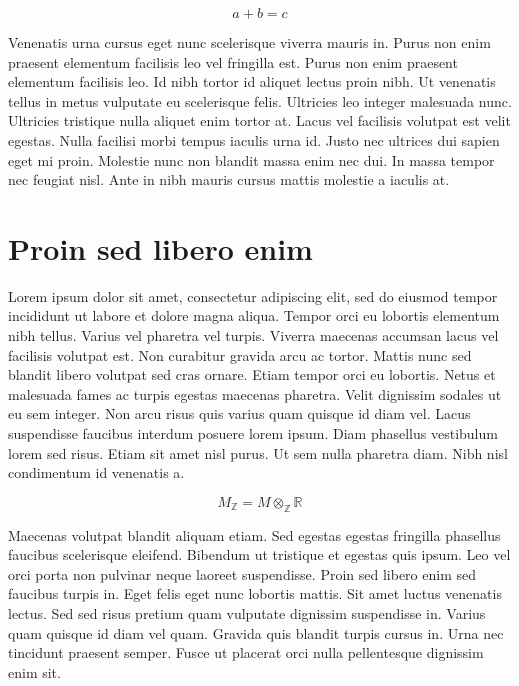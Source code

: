 \documentclass[12pt, a4paper]{article}
\numberwithin{equation}{section}
\begin{document}
\begin{equation}
  a + b = c
\end{equation}

Venenatis urna cursus eget nunc scelerisque viverra mauris in. Purus non enim praesent elementum facilisis leo vel fringilla est. Purus non enim praesent elementum facilisis leo. Id nibh tortor id aliquet lectus proin nibh. Ut venenatis tellus in metus vulputate eu scelerisque felis. Ultricies leo integer malesuada nunc. Ultricies tristique nulla aliquet enim tortor at. Lacus vel facilisis volutpat est velit egestas. Nulla facilisi morbi tempus iaculis urna id. Justo nec ultrices dui sapien eget mi proin. Molestie nunc non blandit massa enim nec dui. In massa tempor nec feugiat nisl. Ante in nibh mauris cursus mattis molestie a iaculis at.


\section{Proin sed libero enim}

Lorem ipsum dolor sit amet, consectetur adipiscing elit, sed do eiusmod tempor incididunt ut labore et dolore magna aliqua. Tempor orci eu lobortis elementum nibh tellus. Varius vel pharetra vel turpis. Viverra maecenas accumsan lacus vel facilisis volutpat est. Non curabitur gravida arcu ac tortor. Mattis nunc sed blandit libero volutpat sed cras ornare. Etiam tempor orci eu lobortis. Netus et malesuada fames ac turpis egestas maecenas pharetra. Velit dignissim sodales ut eu sem integer. Non arcu risus quis varius quam quisque id diam vel. Lacus suspendisse faucibus interdum posuere lorem ipsum. Diam phasellus vestibulum lorem sed risus. Etiam sit amet nisl purus. Ut sem nulla pharetra diam. Nibh nisl condimentum id venenatis a.

\begin{equation}
  M_{\mathbb{Z}} = M \otimes_{\mathbb{Z}} \mathbb{R}
\end{equation}

Maecenas volutpat blandit aliquam etiam. Sed egestas egestas fringilla phasellus faucibus scelerisque eleifend. Bibendum ut tristique et egestas quis ipsum. Leo vel orci porta non pulvinar neque laoreet suspendisse. Proin sed libero enim sed faucibus turpis in. Eget felis eget nunc lobortis mattis. Sit amet luctus venenatis lectus. Sed sed risus pretium quam vulputate dignissim suspendisse in. Varius quam quisque id diam vel quam. Gravida quis blandit turpis cursus in. Urna nec tincidunt praesent semper. Fusce ut placerat orci nulla pellentesque dignissim enim sit.
\end{document}

